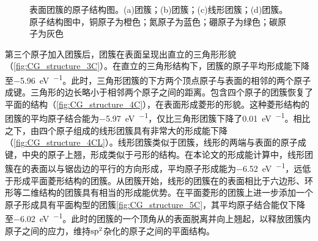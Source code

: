 \begin{figure}[htb]
{            \label{fig:CG_structure_4CL}
        }
        \caption{表面团簇的原子结构图。(a)团簇；(b)团簇；(c)线形团簇；(d)团簇。原子结构图中，铜原子为橙色；氮原子为蓝色；硼原子为绿色；碳原子为灰色}
        \label{fig:CG_structure_3-5C}
    \end{figure}

    第三个原子加入团簇后，团簇在表面呈现出直立的三角形形貌（\ref{fig:CG_structure_3C}）。在直立的三角形结构下，团簇的原子平均形成能下降至\SI{-5.96}{\electronvolt\per\atom}。此时，三角形团簇的下方两个顶点原子与表面的相邻的两个原子成键。三角形的边长略小于相邻两个原子之间的距离。包含四个原子的团簇恢复了平面的结构（\ref{fig:CG_structure_4C}），在表面形成菱形的形貌。这种菱形结构的团簇的平均原子结合能为\SI{-5.97}{\electronvolt\per\atom}，仅比三角形团簇下降了\SI{0.01}{\electronvolt\per\atom}。相比之下，由四个原子组成的线形团簇具有非常大的形成能下降（\ref{fig:CG_structure_4CL}）。线形团簇类似于团簇，线形的两端与表面的原子成键，中央的原子上翘，形成类似于弓形的结构。在本论文的形成能计算中，线形团簇在的表面以与锯齿边的平行的方向形成，平均原子形成能为\SI{-6.52}{\electronvolt\per\atom}，远低于形成平面菱形结构的团簇。从团簇开始，线形的团簇在的表面相比于六边形、环形等二维结构的团簇具有相当的形成能优势。在平面菱形的团簇上进一步添加一个原子形成具有平面构型的团簇\ref{fig:CG_structure_5C}，其平均原子结合能仅下降至\SI{-6.02}{\electronvolt\per\atom}。此时的团簇的一个顶角从的表面脱离并向上翘起，以释放团簇内原子之间的应力，维持$\rm sp^2$杂化的原子之间的平面结构。

